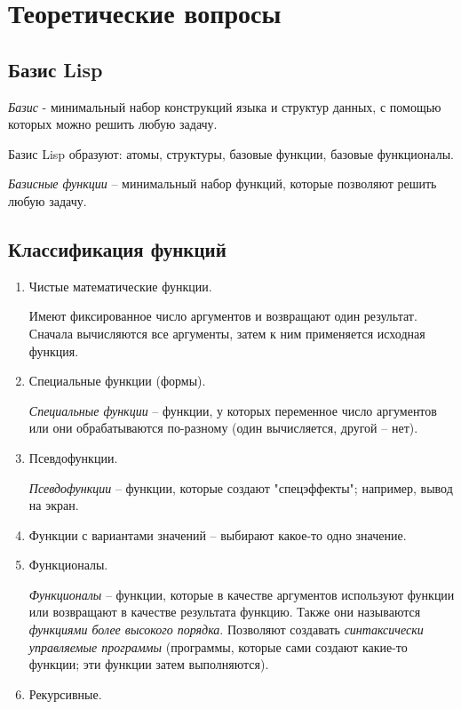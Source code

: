 \chapter{Теоретические вопросы}

\section{Базис Lisp}
\textit{Базис} - минимальный набор конструкций языка и структур данных, с  помощью которых можно решить любую задачу. 

Базис Lisp образуют: атомы, структуры, базовые функции, базовые функционалы.

\textit{Базисные функции} -- минимальный набор функций, которые позволяют решить любую задачу.

\section{Классификация функций}
\begin{enumerate}
	\item Чистые математические функции.
	
	Имеют фиксированное число аргументов и возвращают один результат. Сначала вычисляются все аргументы, затем к ним применяется исходная функция.
	
	\item Специальные функции (формы).
	
	\textit{Специальные функции} -- функции, у которых переменное число аргументов или они обрабатываются по-разному (один вычисляется, другой -- нет).
	
	\item Псевдофункции.
	
	\textit{Псевдофункции} -- функции, которые создают "спецэффекты"; например, вывод на экран.
	
	\item Функции с вариантами значений -- выбирают какое-то одно значение.
	
	\item Функционалы.
	
	\textit{Функционалы} -- функции, которые в качестве аргументов используют функции или возвращают в качестве результата функцию. Также они называются \textit{функциями более высокого порядка}. Позволяют создавать \textit{синтаксически управляемые программы} (программы, которые сами создают какие-то функции; эти функции затем выполняются). 
	
	\item Рекурсивные.
\end{enumerate}

